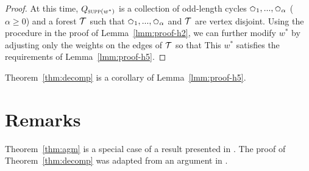 \begin{proof}
    \vgap

    At this time, $Q_{\textsc{supp}(w^*)}$ is a collection of odd-length cycles $\mycycle_1, ..., \mycycle_\alpha$ ($\alpha \ge 0$) and a forest $\mathcal{T}$ such that $\mycycle_1, ..., \mycycle_\alpha$ and $\mathcal{T}$ are vertex disjoint. Using the procedure in the proof of Lemma~\ref{lmm:proof-h2}, we can further modify $w^*$ by adjusting only the weights on the edges of $\mathcal{T}$ so that
    This $w^*$ satisfies the requirements of Lemma~\ref{lmm:proof-h5}.
\end{proof}

Theorem~\ref{thm:decomp} is a corollary of Lemma~\ref{lmm:proof-h5}.

\section{Remarks}

Theorem~\ref{thm:agm} is a special case of a result presented in \cite{agm13}. The proof of Theorem~\ref{thm:decomp} was adapted from an argument in \cite{akk19}.




